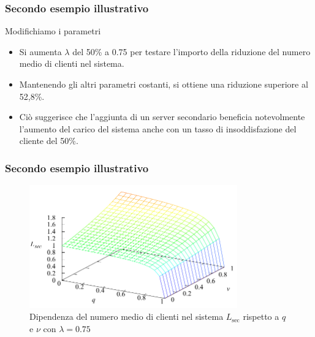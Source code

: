 \documentclass{beamer}
\begin{document}


\begin{frame}
    \frametitle{Secondo esempio illustrativo}
\begin{block}{Modifichiamo i parametri}
        \begin{itemize}
            \item Si aumenta $\lambda$ del 50\% a 0.75 per testare l'importo della riduzione del numero medio di clienti nel sistema.
            \item Mantenendo gli altri parametri costanti, si ottiene una riduzione superiore al 52,8\%.
            \item Ciò suggerisce che l'aggiunta di un server secondario beneficia notevolmente l'aumento del carico del sistema anche con un tasso di insoddisfazione del cliente del 50\%.
        \end{itemize}
\end{block}
\end{frame}


\begin{frame}
    \frametitle{Secondo esempio illustrativo}
    \begin{figure}[h]
        \centering
        \includegraphics[width=0.8\textwidth]{0uFWo7C.png}
        \caption{ Dipendenza del numero medio di clienti nel sistema $L_{\mathrm{sec}}$ rispetto a $q$ e $\nu$ con $\lambda=0.75$}
    \end{figure}
\end{frame}
\end{document}
